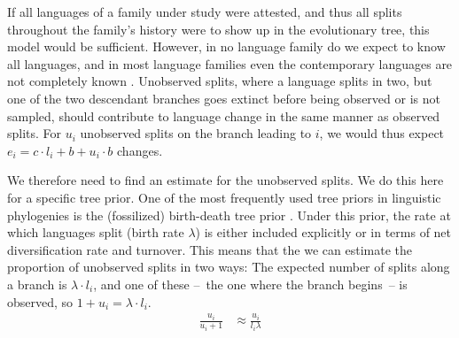 \documentclass[]{rsos}%
\begin{document}
%

If all languages of a family under study were attested, and thus all splits throughout
the family's history were to show up in the evolutionary tree, this model would be sufficient.
However, in no language family do we expect to know all languages, and in most
language families even the contemporary languages are not completely known \parencite{glottoscope}. 
Unobserved splits, where a language splits in two, but one of
the two descendant branches goes extinct before being observed or is not sampled,
should contribute to language change in the same manner as observed splits.
For $u_i$ unobserved splits on the branch leading to $i$, we would thus expect $e_i = c \cdot l_i + b + u_i \cdot b$ changes.

We therefore need to find an estimate for the unobserved splits.
We do this here for a specific tree prior.
One of the most frequently used tree priors in linguistic phylogenies
is the (fossilized) birth-death tree prior \parencite{gernhard2008conditioned,stadler2010samplingthroughtime,heath2014fossilized,rama2018three}.
Under this prior, the rate at which
languages split (birth rate $\lambda$) is either included explicitly or in terms of net diversification rate and turnover.
 This means that the we can estimate the proportion of unobserved splits in two ways:
The expected number of splits along a branch is $\lambda \cdot l_i$, and one of these –~the one where the branch begins~– is observed, so $1 + u_i = \lambda \cdot l_i$.
\begin{align}
  \frac{u_i}{u_i + 1} & \approx \frac{u_i}{l_i \lambda}
\end{align}
\end{document}
